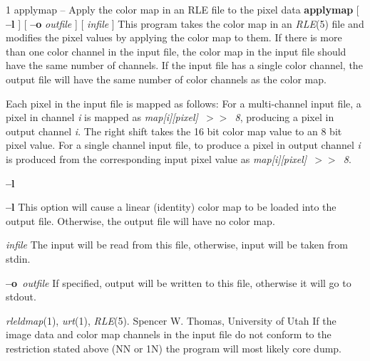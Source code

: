 


%
%
 1
applymap -- Apply the color map in an RLE file to the pixel data
{\bf applymap}
[
{\bf --l}
] [
{\bf --o}
{\it outfile}
] [ 
{\it infile}
] 
This program takes the color map in an
{\it RLE}{\rm (5)}
file and modifies the pixel values by applying the color map to them.
If there is more than one color channel in the input file,
the color map in the input file should have the same number of
channels.  If the input file has a single color channel, the
output file will have the same number of color channels as the color
map.

Each pixel in the input file is mapped as follows:  For a
multi-channel input file, a pixel in channel
{\it i}
is mapped as
{\it map[i][pixel]\ $>$$>$\ 8}{\rm ,}
producing a pixel in output channel
{\it i}{\rm .}
The right shift takes the 16 bit color map value to an 8 bit pixel
value.  For a single channel input file, to produce a pixel in output
channel
{\it i}
is produced from the corresponding input pixel value
as
{\it map[i][pixel]\ $>$$>$\ 8}{\rm .}
\begin{TPlist}{{\bf --l}}
\item[{{\bf --l}}]
This option will cause a linear (identity) color map to be loaded into the
output file.  Otherwise, the output file will have no color map.
\item[{{\it infile}}]
The input will be read from this file, otherwise, input will
be taken from stdin.
\item[{{\bf --o}{\it \ outfile}
}]
If specified, output will be written to this file, otherwise it will
go to stdout.
\end{TPlist}
{\it rleldmap}{\rm (1),}
{\it urt}{\rm (1),}
{\it RLE}{\rm (5).}
Spencer W. Thomas, University of Utah
If the image data and color map channels in the input file do not conform to
the restriction stated above (NN or 1N) the program will most likely
core dump.
\newpage


